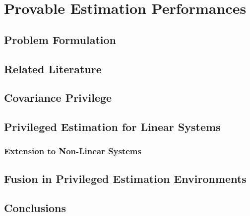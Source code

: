 
\chapter{Provable Estimation Performances}
\section{Problem Formulation}
\section{Related Literature}
\section{Covariance Privilege}
\section{Privileged Estimation for Linear Systems}
\subsection{Extension to Non-Linear Systems}
\section{Fusion in Privileged Estimation Environments}
\section{Conclusions}